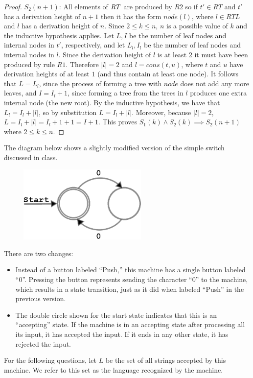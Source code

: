 \documentclass[]{exam}
\theoremstyle{definition}
\newcommand{\id}[1]{\mbox{\it #1\/}}
\begin{document}
\begin{questions}
\begin{parts}
\begin{solution}
\begin{proof}
$S_2(n+1)$: All elements of $\id{RT}$ are produced by $R2$ so if $t' \in RT$
and $t'$ has a derivation height of $n+ 1$ then it has the form $node(l)$, where 
$l \in RTL$ and $l$ has a derivation height of $n$. Since $2 \leq k \leq n$, 
$n$ is a possible value of $k$ and the inductive hypothesis applies.  Let $L, I$ 
be the number of leaf nodes and internal nodes in $t'$, respectively, and 
let $L_l,I_l$ be the number of leaf nodes and internal nodes in $l$. Since the 
derivation height of $l$ is at least $2$ it must have been produced by
rule $R1$. Therefore $|l| = 2$ and $l = cons(t,u)$, where $t$ and $u$ have
derivation heights of at least $1$ (and thus contain at least one node).
It follows that $L = L_l$, since the process of forming a tree with $node$ 
does not add any more leaves, and $I = I_l + 1$, since forming a tree from 
the trees in $l$ produces one extra internal node (the new root). By the 
inductive hypothesis, we have that $L_l = I_l + |l|$, so by substitution 
$L = I_l + |l|$. Moreover, because $|l| = 2$, $L = I_l + |l| = I_l + 1 + 1 = I +
1$. This proves $S_1(k) \land S_2(k) \implies S_2(n+1)$ where $2 \leq k \leq n$.
\end{proof}
\end{solution}
\end{parts}
\question The diagram below shows a slightly modified version of the simple
switch discussed in class. \\
\begin{figure}[h]
\centering
\includegraphics[width=2.5in, height=.75in,keepaspectratio=true]{evenzeroautomata.eps}
\label{2sp}
\end{figure}

There are two changes:
\begin{itemize}
\item Instead of a button labeled ``Push,'' this machine has a single button
labeled ``0''. Pressing the button represents sending the character ``0''
to the machine, which results in a state transition, just as it did when labeled
``Push'' in the previous version.
\item The double circle shown for the start state indicates that this is an
``accepting'' state. If the machine is in an accepting state after processing
all its input, it has accepted the input. If it ends in any other state, it has
rejected the input.
\end{itemize}
For the following questions, let $L$ be the set of all strings accepted by this machine. 
We refer to this set as the language recognized by the machine.


\end{questions}
\end{document}
